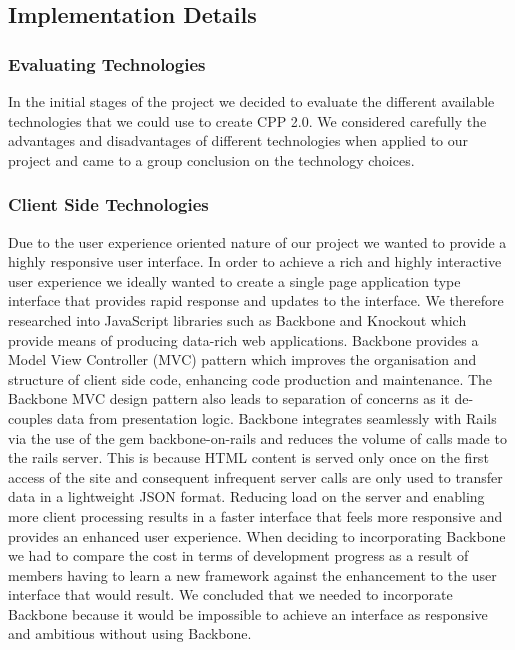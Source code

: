 \subsection{Implementation Details}

	\subsubsection{Evaluating Technologies}
		In the initial stages of the project we decided to evaluate the different available technologies that we could use to create CPP 2.0. We considered carefully the advantages and disadvantages of different technologies when applied to our project and came to a group conclusion on the technology choices.

	\subsubsection{Client Side Technologies}
		Due to the user experience oriented nature of our project we wanted to provide a highly responsive user interface. 
		In order to achieve a rich and highly interactive user experience we ideally wanted to create a single page application type interface that provides rapid response and updates to the interface. We therefore researched into JavaScript libraries such as Backbone and Knockout which provide means of producing data-rich web applications.  
		Backbone provides a Model View Controller (MVC) pattern which improves the organisation and structure of client side code, enhancing code production and maintenance. The Backbone MVC design pattern also leads to separation of concerns as it de-couples data from presentation logic. Backbone integrates seamlessly with Rails via the use of the gem backbone-on-rails and reduces the volume of calls made to the rails server. This is because HTML content is served only once on the first access of the site and consequent infrequent server calls are only used to transfer data in a lightweight JSON format. Reducing load on the server and enabling more client processing results in a faster interface that feels more responsive and provides an enhanced user experience.
		When deciding to incorporating Backbone we had to compare the cost in terms of development progress as a result of members having to learn a new framework against the enhancement to the user interface that would result. We concluded that we needed to incorporate Backbone because it would be impossible to achieve an interface as responsive and ambitious without using Backbone.

